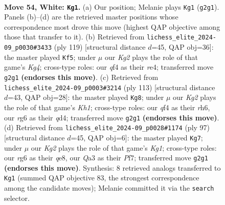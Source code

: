 \documentclass[11pt]{article}
\begin{document}
\clearpage

\begin{figure}[p]\centering
\begin{subfigure}{0.46\textwidth}\centering
\resizebox{\linewidth}{!}{%
\newchessgame
\chessboard[
  setfen={8/8/5pr1/3p1k2/5q2/Q5P1/P5KP/8 w - - 2 54},
  showmover=false,
  pgfstyle=straightmove, color=movearrow, markmove={g2-g1}
]}
\caption{}
\end{subfigure}\hfill
\begin{subfigure}{0.46\textwidth}\centering
\resizebox{\linewidth}{!}{%
\newchessgame
\chessboard[
  setfen={8/8/3q3p/p2p2k1/4R3/8/6P1/3R3K b - - 5 60},
  showmover=false,
  pgfstyle=straightmove, color=movearrow, markmove={g5-f5}
]}
\caption{}
\end{subfigure}
\\[4pt]
\begin{subfigure}{0.46\textwidth}\centering
\resizebox{\linewidth}{!}{%
\newchessgame
\chessboard[
  setfen={7k/2q3p1/7R/7P/p2Q4/Pb6/4PK2/8 b - - 0 57},
  showmover=false,
  pgfstyle=straightmove, color=movearrow, markmove={h8-g8}
]}
\caption{}
\end{subfigure}\hfill
\begin{subfigure}{0.46\textwidth}\centering
\resizebox{\linewidth}{!}{%
\newchessgame
\chessboard[
  setfen={4Q1k1/5p2/6p1/5p1P/1p6/5RK1/2q5/8 b - - 1 49},
  showmover=false,
  pgfstyle=straightmove, color=movearrow, markmove={g8-g7}
]}
\caption{}
\end{subfigure}
\caption{\textbf{Move 54, White: \texttt{Kg1}.} (a) Our position; Melanie plays \texttt{Kg1} (\texttt{g2g1}). Panels (b)--(d) are the retrieved master positions whose correspondence most drove this move (highest QAP objective among those that transfer to it). (b) Retrieved from \texttt{lichess\_elite\_2024-09\_p0030\#3433} (ply 119) [structural distance $d$=45, QAP obj=36]: the master played \texttt{Kf5}; under $\mu$ our \emph{Kg2} plays the role of that game's \emph{Kg4}; cross-type roles: our \emph{q}f4 as their \emph{r}e4; transferred move \texttt{g2g1} \textbf{(endorses this move)}. (c) Retrieved from \texttt{lichess\_elite\_2024-09\_p0003\#3214} (ply 113) [structural distance $d$=43, QAP obj=28]: the master played \texttt{Kg8}; under $\mu$ our \emph{Kg2} plays the role of that game's \emph{Kh1}; cross-type roles: our \emph{q}f4 as their \emph{r}h6, our \emph{r}g6 as their \emph{q}d4; transferred move \texttt{g2g1} \textbf{(endorses this move)}. (d) Retrieved from \texttt{lichess\_elite\_2024-09\_p0028\#1174} (ply 97) [structural distance $d$=45, QAP obj=6]: the master played \texttt{Kg7}; under $\mu$ our \emph{Kg2} plays the role of that game's \emph{Kg1}; cross-type roles: our \emph{r}g6 as their \emph{q}e8, our \emph{Q}a3 as their \emph{P}f7; transferred move \texttt{g2g1} \textbf{(endorses this move)}. Synthesis: 8 retrieved analogs transferred to \texttt{Kg1} (summed QAP objective 83, the strongest correspondence among the candidate moves); Melanie committed it via the \texttt{search} selector.}
\label{fig:thought-m106}
\end{figure}
\end{document}
